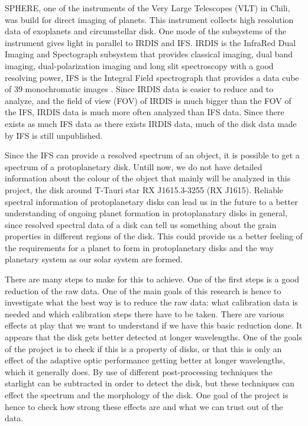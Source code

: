 \documentclass[twoside,single]{lion-msc}
\begin{document}
SPHERE, one of the instruments of the Very Large Telescopes (VLT) in Chili, was build for direct imaging of planets. This instrument collects high resolution data of exoplanets and circumstellar disk. One mode of the subsystems of the instrument gives light in parallel to IRDIS and IFS. IRDIS is the InfraRed Dual Imaging and Spectograph subsystem that provides classical imaging, dual band imaging, dual-polarization imaging and long slit spectroscopy with a good resolving power, IFS is the Integral Field spectrograph that provides a data cube of 39 monochromatic images \cite{Observatory2007}. Since IRDIS data is easier to reduce and to analyze, and the field of view (FOV) of IRDIS is much bigger than the FOV of the IFS, IRDIS data is much more often analyzed than IFS data. Since there exists as much IFS data as there exists IRDIS data, much of the disk data made by IFS is still unpublished.
\bigskip

Since the IFS can provide a resolved spectrum of an object, it is possible to get a spectrum of a protoplanetary disk. Untill now, we do not have detailed information about the colour of the object that mainly will be analyzed in this project, the disk around T-Tauri star RX J1615.3-3255 (RX J1615). Reliable spectral information of protoplanetary disks can lead us in the future to a better understanding of ongoing planet formation in protoplanatary disks in general, since resolved spectral data of a disk can tell us something about the grain properties in different regions of the disk. This could provide us a better feeling of the requirements for a planet to form in protoplanetary disks and the way planetary system as our solar system are formed. 
\bigskip

There are many steps to make for this to achieve. One of the first steps is a good reduction of the raw data. One of the main goals of this research is hence to investigate what the best way is to reduce the raw data: what calibration data is needed and which calibration steps there have to be taken. There are various effects at play that we want to understand if we have this basic reduction done. It appears that the disk gets better detected at longer wavelengths. One of the goals of the project is to check if this is a property of disks, or that this is only an effect of the adaptive optic performance getting better at longer wavelengths, which it generally does. By use of different post-processing techniques the starlight can be subtracted in order to detect the disk, but these techniques can effect the spectrum and the morphology of the disk. One goal of the project is hence to check how strong these effects are and what we can trust out of the data.
\bigskip
\end{document}
